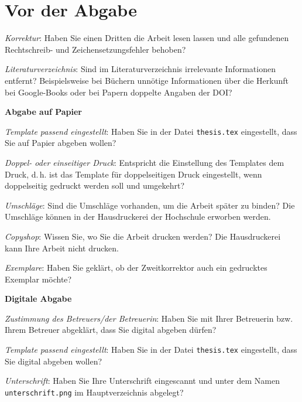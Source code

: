 \section{Vor der Abgabe}

\begin{checklist}
  \footnotesize
  \item \textit{Korrektur}: Haben Sie einen Dritten die Arbeit lesen lassen und alle gefundenen Rechtschreib- und Zeichensetzungsfehler behoben?
  \item \textit{Literaturverzeichnis}: Sind im Literaturverzeichnis irrelevante Informationen entfernt? Beispielsweise bei Büchern unnötige Informationen über die Herkunft bei Google-Books oder bei Papern doppelte Angaben der DOI?
  \item \textbf{Abgabe auf Papier}
  \begin{checklist}
    \item \textit{Template passend eingestellt}: Haben Sie in der Datei \texttt{thesis.tex} eingestellt, dass Sie auf Papier abgeben wollen?
    \item \textit{Doppel- oder einseitiger Druck}: Entspricht die Einstellung des Templates dem Druck, d.\,h. ist das Template für doppelseitigen Druck eingestellt, wenn doppelseitig gedruckt werden soll und umgekehrt?
    \item \textit{Umschläge}: Sind die Umschläge vorhanden, um die Arbeit später zu binden? Die Umschläge können in der Hausdruckerei der Hochschule erworben werden.
    \item \textit{Copyshop}: Wissen Sie, wo Sie die Arbeit drucken werden? Die Hausdruckerei kann Ihre Arbeit nicht drucken.
    \item \textit{Exemplare}: Haben Sie geklärt, ob der Zweitkorrektor auch ein gedrucktes Exemplar möchte?
  \end{checklist}
  \item \textbf{Digitale Abgabe}
  \begin{checklist}
    \item \textit{Zustimmung des Betreuers/der Betreuerin}: Haben Sie mit Ihrer Betreuerin bzw. Ihrem Betreuer abgeklärt, dass Sie digital abgeben dürfen?
    \item \textit{Template passend eingestellt}: Haben Sie in der Datei \texttt{thesis.tex} eingestellt, dass Sie digital abgeben wollen?
    \item \textit{Unterschrift}: Haben Sie Ihre Unterschrift eingescannt und unter dem Namen \texttt{unterschrift.png} im Hauptverzeichnis abgelegt?
  \end{checklist}
\end{checklist}

